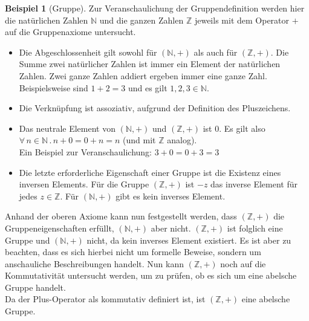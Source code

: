 \documentclass[12pt,a4paper, usenames, dvipsnames]{article}
\theoremstyle{mystyle}
\theoremstyle{definition}
\newtheorem{bsp}{Beispiel}[definition]
\begin{document}
\begin{bsp}[Gruppe]

Zur Veranschaulichung der Gruppendefinition werden hier die natürlichen Zahlen $\mathbb{N}$ und die ganzen Zahlen $\mathbb{Z}$ jeweils mit dem Operator $+$ auf die Gruppenaxiome untersucht.
\begin{itemize}
\item Die Abgeschlossenheit gilt sowohl für $(\mathbb{N},+)$ als auch für $(\mathbb{Z},+)$. Die Summe zwei natürlicher Zahlen ist immer ein Element der natürlichen Zahlen. Zwei ganze Zahlen addiert ergeben immer eine ganze Zahl. \\
Beispielsweise sind $1+2=3$ und es gilt $1,2,3 \in \mathbb{N}$.
\item Die Verknüpfung ist assoziativ, aufgrund der Definition des Pluszeichens.
\item Das neutrale Element von $(\mathbb{N},+)$ und $(\mathbb{Z},+)$ ist $0$. Es gilt also $\forall \, n \in \mathbb{N} \, . \, n + 0 = 0 + n = n$ (und mit $\mathbb{Z}$ analog). \\
Ein Beispiel zur Veranschaulichung: $3+0=0+3=3$
\item Die letzte erforderliche Eigenschaft einer Gruppe ist die Existenz eines inversen Elements. Für die Gruppe $(\mathbb{Z},+)$ ist $-z$ das inverse Element für jedes $z \in \mathbb{Z}$. Für $(\mathbb{N},+)$ gibt es kein inverses Element.
\end{itemize}
Anhand der oberen Axiome kann nun festgestellt werden, dass $(\mathbb{Z},+)$ die Gruppeneigenschaften erfüllt, $(\mathbb{N},+)$ aber nicht. 
$(\mathbb{Z},+)$ ist folglich eine Gruppe und $(\mathbb{N},+)$ nicht, da kein inverses Element existiert. 
Es ist aber zu beachten, dass es sich hierbei nicht um formelle Beweise, sondern um anschauliche Beschreibungen handelt.
Nun kann $(\mathbb{Z},+)$ noch auf die Kommutativität untersucht werden, um zu prüfen, ob es sich um eine abelsche Gruppe handelt. \\
Da der Plus-Operator als kommutativ definiert ist, ist $(\mathbb{Z},+)$ eine abelsche Gruppe.

\end{bsp}
\end{document}
